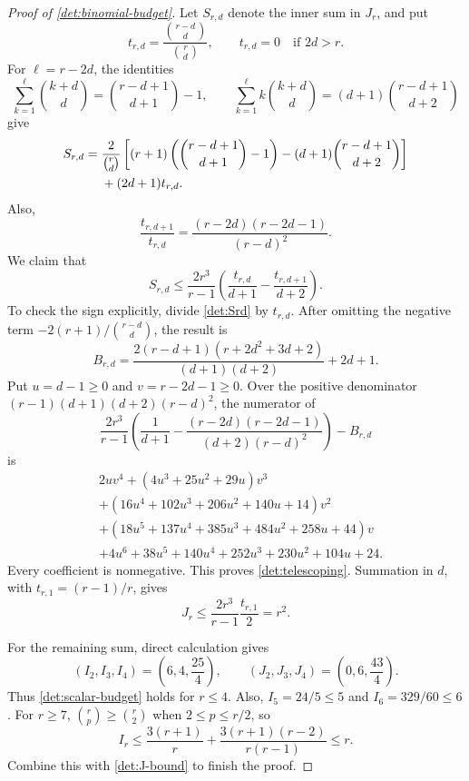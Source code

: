 \begin{proof}[Proof of \cref{det:binomial-budget}]
Let $S_{r,d}$ denote the inner sum in $J_r$, and put
\[
 t_{r,d}=\frac{\binom{r-d}{d}}{\binom rd},\qquad
 t_{r,d}=0\quad\text{if }2d>r.
\]
For $\ell=r-2d$, the identities
\[
 \sum_{k=1}^{\ell}\binom{k+d}{d}
     =\binom{r-d+1}{d+1}-1,\qquad
 \sum_{k=1}^{\ell}k\binom{k+d}{d}
     =(d+1)\binom{r-d+1}{d+2}
\]
give
\begin{align}
 S_{r,d}={}&\frac2{\binom rd}
  \left[(r+1)\left(\binom{r-d+1}{d+1}-1\right)
       -(d+1)\binom{r-d+1}{d+2}\right]\notag\\
 &+(2d+1)t_{r,d}.
 \label{det:Srd}
\end{align}
Also,
\[
 \frac{t_{r,d+1}}{t_{r,d}}
 =\frac{(r-2d)(r-2d-1)}{(r-d)^2}.
\]
We claim that
\begin{equation}\label{det:telescoping}
 S_{r,d}\leq\frac{2r^3}{r-1}
  \left(\frac{t_{r,d}}{d+1}-\frac{t_{r,d+1}}{d+2}\right).
\end{equation}
To check the sign explicitly, divide \eqref{det:Srd} by $t_{r,d}$.
After omitting the negative term
$-2(r+1)/\binom{r-d}{d}$, the result is
\[
 B_{r,d}=\frac{2(r-d+1)(r+2d^2+3d+2)}{(d+1)(d+2)}+2d+1.
\]
Put $u=d-1\geq0$ and $v=r-2d-1\geq0$.  Over the positive denominator
$(r-1)(d+1)(d+2)(r-d)^2$, the numerator of
\[
 \frac{2r^3}{r-1}\left(\frac1{d+1}
    -\frac{(r-2d)(r-2d-1)}{(d+2)(r-d)^2}\right)-B_{r,d}
\]
is
\begin{align*}
 {}&2uv^4+(4u^3+25u^2+29u)v^3\\
 &+(16u^4+102u^3+206u^2+140u+14)v^2\\
 &+(18u^5+137u^4+385u^3+484u^2+258u+44)v\\
 &+4u^6+38u^5+140u^4+252u^3+230u^2+104u+24.
\end{align*}
Every coefficient is nonnegative.  This proves
\eqref{det:telescoping}.  Summation in $d$, with
$t_{r,1}=(r-1)/r$, gives
\begin{equation}\label{det:J-bound}
 J_r\leq\frac{2r^3}{r-1}\frac{t_{r,1}}2=r^2.
\end{equation}

For the remaining sum, direct calculation gives
\[
 (I_2,I_3,I_4)=\left(6,4,\frac{25}{4}\right),\qquad
 (J_2,J_3,J_4)=\left(0,6,\frac{43}{4}\right).
\]
Thus \eqref{det:scalar-budget} holds for $r\leq4$.
Also, $I_5=24/5\leq5$ and $I_6=329/60\leq6$.  For $r\geq7$,
$\binom rp\geq\binom r2$ when $2\leq p\leq r/2$, so
\[
 I_r\leq\frac{3(r+1)}r
       +\frac{3(r+1)(r-2)}{r(r-1)}\leq r.
\]
Combine this with \eqref{det:J-bound} to finish the proof.
\end{proof}

